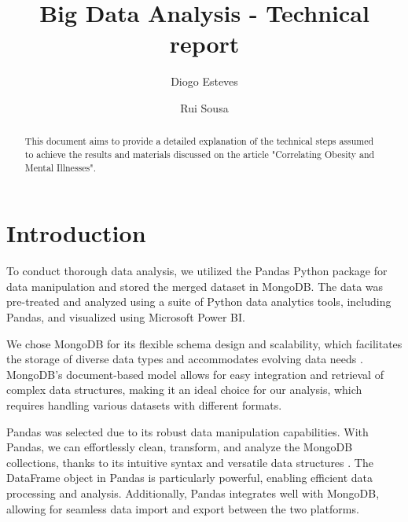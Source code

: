 \documentclass[runningheads]{llncs}
\begin{document}
%
\title{Big Data Analysis - Technical report}
%
\author{Diogo Esteves \and Rui Sousa}
%
%

\maketitle \begin{abstract}
This document aims to provide a detailed explanation of the technical steps assumed to achieve the results and materials discussed on the article "Correlating Obesity and Mental Illnesses".
\end{abstract}
%
%
%
\section{Introduction}

To conduct thorough data analysis, we utilized the Pandas Python package for data manipulation and stored the merged dataset in MongoDB. The data was pre-treated and analyzed using a suite of Python data analytics tools, including Pandas, and visualized using Microsoft Power BI.

We chose MongoDB for its flexible schema design and scalability, which facilitates the storage of diverse data types and accommodates evolving data needs \cite{mongodbarchguide}. MongoDB's document-based model allows for easy integration and retrieval of complex data structures, making it an ideal choice for our analysis, which requires handling various datasets with different formats.

Pandas was selected due to its robust data manipulation capabilities. With Pandas, we can effortlessly clean, transform, and analyze the MongoDB collections, thanks to its intuitive syntax and versatile data structures \cite{pandasdocs}. The DataFrame object in Pandas is particularly powerful, enabling efficient data processing and analysis. Additionally, Pandas integrates well with MongoDB, allowing for seamless data import and export between the two platforms.
\end{document}
